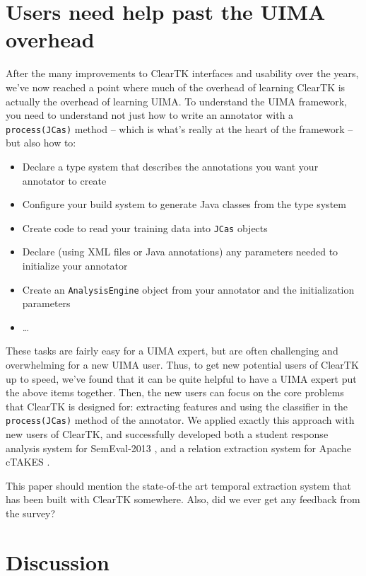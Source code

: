 \documentclass[10pt, a4paper]{article}
\newcommand{\code}[1]{\texttt{\small #1}}
\begin{document}
\section{Users need help past the UIMA overhead}
After the many improvements to ClearTK interfaces and usability over the years, we've now reached a point where much of the overhead of learning ClearTK is actually the overhead of learning UIMA.
To understand the UIMA framework, you need to understand not just how to write an annotator with a \code{process(JCas)} method -- which is what's really at the heart of the framework -- but also how to:
\begin{itemize}
\item Declare a type system that describes the annotations you want your annotator to create
\item Configure your build system to generate Java classes from the type system
\item Create code to read your training data into \code{JCas} objects
\item Declare (using XML files or Java annotations) any parameters needed to initialize your annotator
\item Create an \code{AnalysisEngine} object from your annotator and the initialization parameters
\item \ldots
\end{itemize}
These tasks are fairly easy for a UIMA expert, but are often challenging and overwhelming for a new UIMA user.
Thus, to get new potential users of ClearTK up to speed, we've found that it can be quite helpful to have a UIMA expert put the above items together.
Then, the new users can focus on the core problems that ClearTK is designed for: extracting features and using the classifier in the \code{process(JCas)} method of the annotator.
We applied exactly this approach with new users of ClearTK, and successfully developed both a student response analysis system for SemEval-2013 \cite{okoye-bethard-sumner:2013:SemEval-2013}, and a relation extraction system for Apache cTAKES \cite{dligach2013discovering}.

This paper should mention the state-of-the art temporal extraction system that has been built with ClearTK somewhere.  Also, did we ever get any feedback from the survey?

\section{Discussion}



\end{document}
